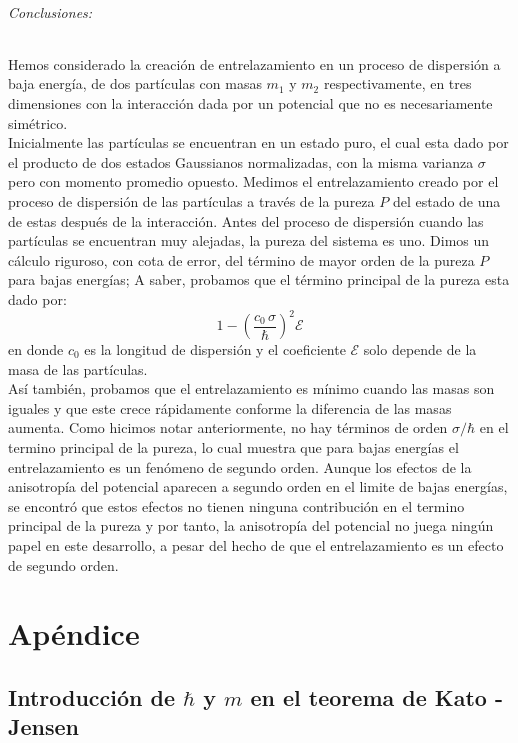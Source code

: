 \documentclass[12pt]{book}
\numberwithin{equation}{chapter}
\def\E{\mathcal{E}}
\begin{document}
\paragraph{Conclusiones:\\ }
Hemos considerado la creaci\'on de entrelazamiento en un proceso de dispersi\'on a baja energ\'ia, de dos part\'iculas con masas $m_{1}$ y $m_{2}$ respectivamente, en tres dimensiones con la interacci\'on dada por un potencial que no es necesariamente sim\'etrico.\\ 
Inicialmente las part\'iculas se encuentran en un estado puro, el cual esta dado por el producto de dos estados Gaussianos normalizadas, con la misma varianza $\sigma$ pero con momento promedio opuesto. Medimos el entrelazamiento creado por el proceso de dispersi\'on de las part\'iculas a trav\'es de la pureza $P$ del estado de una de estas despu\'es de la interacci\'on. Antes del proceso de dispersi\'on cuando las part\'iculas se encuentran muy alejadas, la pureza del sistema es uno. Dimos un c\'alculo riguroso, con cota de error, del t\'ermino de mayor orden de la pureza $P$ para bajas energ\'ias; A saber, probamos que el t\'ermino principal de la pureza esta dado por:
$$ 1- \left( \frac{c_{0} \, \sigma}{\hbar} \right)^{2} \E $$
en donde $c_{0}$ es la longitud de dispersi\'on y el coeficiente $\E$ solo depende de la masa de las part\'iculas. \\
As\'i tambi\'en, probamos que el entrelazamiento es m\'inimo cuando las masas son iguales y que este crece r\'apidamente conforme la diferencia de las masas aumenta. Como hicimos notar anteriormente, no hay t\'erminos de orden $\sigma/\hbar$ en el termino principal de la pureza, lo cual muestra que para bajas energ\'ias el entrelazamiento es un fen\'omeno de segundo orden. Aunque los efectos de la anisotrop\'ia del potencial aparecen a segundo orden en el limite de bajas energ\'ias, se encontr\'o que estos efectos no tienen ninguna contribuci\'on en el termino principal de la pureza y por tanto, la anisotrop\'ia del potencial no juega ning\'un papel en este desarrollo, a pesar del hecho de que el entrelazamiento es un efecto de segundo orden.


\part{Ap\'endice}

\appendix

\chapter{Introducci\'on de $\hbar$ y $m$ en el teorema de Kato - Jensen}
\end{document}
